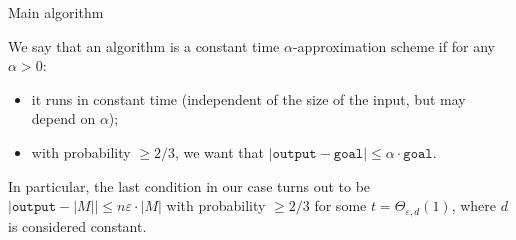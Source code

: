 \begin{Algo}{Main algorithm}
\label{main}
\end{Algo}


\begin{definition}
We say that an algorithm is a constant time $\alpha$-approximation scheme if for any $\alpha >0$:
\begin{itemize}
\item it runs in constant time (independent of the size of the input, but may depend on $\alpha$);
\item with probability $\geq 2/3$, we want that $|\texttt{output} - \texttt{goal}| \leq \alpha \cdot \texttt{goal}$.
\end{itemize}
\end{definition}

In particular, the last condition in our case turns out to be $|\texttt{output} - |M|| \leq n\varepsilon \cdot |M|$ with probability $\geq 2/3$  for some $t = \Theta_{\varepsilon,d}(1)$, where $d$ is considered constant.

